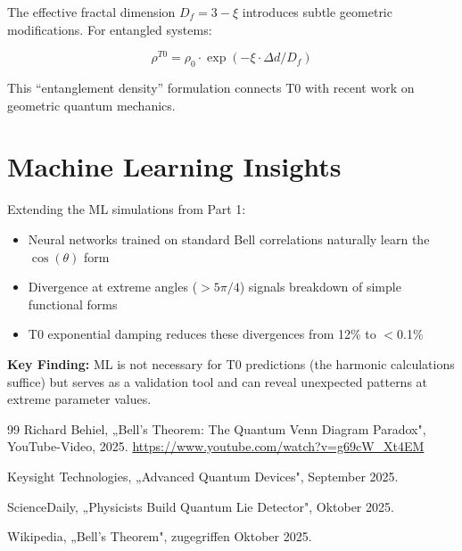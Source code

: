 The effective fractal dimension $D_f = 3 - \xi$ introduces subtle geometric modifications. For entangled systems:

\begin{equation}
\rho^{T0} = \rho_0 \cdot \exp(-\xi \cdot \Delta d / D_f)
\end{equation}

This ``entanglement density'' formulation connects T0 with recent work on geometric quantum mechanics.

\section{Machine Learning Insights}
\label{sec:ml_extended}

Extending the ML simulations from Part 1:

\begin{itemize}
\item Neural networks trained on standard Bell correlations naturally learn the $\cos(\theta)$ form
\item Divergence at extreme angles ($> 5\pi/4$) signals breakdown of simple functional forms
\item T0 exponential damping reduces these divergences from 12\% to $<$0.1\%
\end{itemize}

\textbf{Key Finding:} ML is not necessary for T0 predictions (the harmonic calculations suffice) but serves as a validation tool and can reveal unexpected patterns at extreme parameter values.
\begin{thebibliography}{99}
	Richard Behiel, „Bell's Theorem: The Quantum Venn Diagram Paradox", 
	YouTube-Video, 2025. 
	\url{https://www.youtube.com/watch?v=g69cW_Xt4EM}
	
	Keysight Technologies, „Advanced Quantum Devices", September 2025.
	
	ScienceDaily, „Physicists Build Quantum Lie Detector", Oktober 2025.
	
	Wikipedia, „Bell's Theorem", zugegriffen Oktober 2025.
\end{thebibliography}